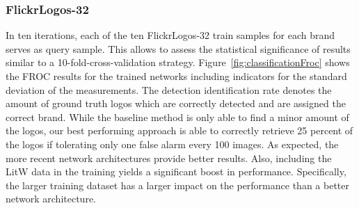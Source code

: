 \documentclass[a4paper,twoside]{article}
\begin{document}
\subsubsection*{FlickrLogos-32}
In ten iterations, each of the ten FlickrLogos-32 train samples for each brand serves as query sample. This allows to assess the statistical significance of results similar to a 10-fold-cross-validation strategy. Figure~\ref{fig:classificationFroc} shows the FROC results for the trained networks including indicators for the standard deviation of the measurements. The detection identification rate denotes the amount of ground truth logos which are correctly detected and are assigned the correct brand.
While the baseline method is only able to find a minor amount of the logos, our best performing approach is able to correctly retrieve 25 percent of the logos if tolerating only one false alarm every 100 images.
As expected, the more recent network architectures provide better results. Also, including the \ac{LitW} data in the training yields a significant boost in performance. Specifically, the larger training dataset has a larger impact on the performance than a better network architecture. 
\end{document}
